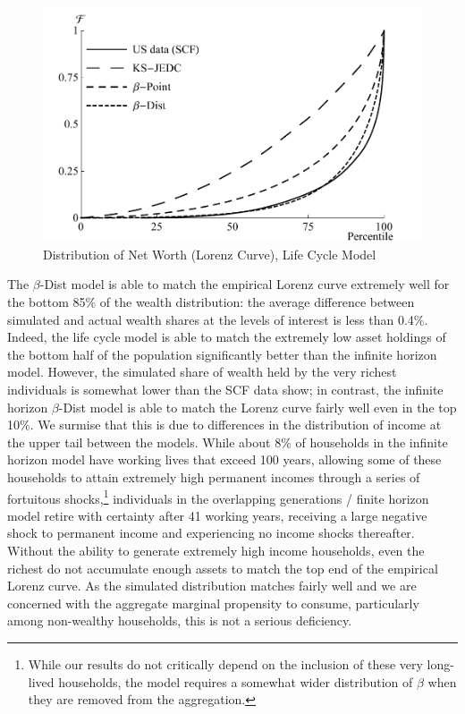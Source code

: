 \documentclass[11pt,a4paper,pdftex]{article}\usepackage[pdftex]{graphicx}\usepackage{epstopdf} \usepackage[pdftex]{hyperref}
\newcommand{\Discount}{\ensuremath{\beta}}
\begin{document}
\begin{figure}
\caption{Distribution of Net Worth (Lorenz Curve), Life Cycle Model}
\label{fig:LorenzLifeCycle}
\begin{center}
\includegraphics[scale=0.75]{../Figures/LifeCycleLorenzPlot.pdf}
\end{center}
\end{figure}

The \Discount-Dist model is able to match the empirical Lorenz curve extremely well for the bottom 85\% of the wealth distribution: the average difference between simulated and actual wealth shares at the levels of interest is less than 0.4\%.  Indeed, the life cycle model is able to match the extremely low asset holdings of the bottom half of the population significantly better than the infinite horizon model.  However, the simulated share of wealth held by the very richest individuals is somewhat lower than the SCF data show; in contrast, the infinite horizon \Discount-Dist model is able to match the Lorenz curve fairly well even in the top 10\%.  We surmise that this is due to differences in the distribution of income at the upper tail between the models.  While about 8\% of households in the infinite horizon model have working lives that exceed 100 years, allowing some of these households to attain extremely high permanent incomes through a series of fortuitous shocks,\footnote{While our results do not critically depend on the inclusion of these very long-lived households, the model requires a somewhat wider distribution of $\Discount$ when they are removed from the aggregation.} individuals in the overlapping generations / finite horizon model retire with certainty after 41 working years, receiving a large negative shock to permanent income and experiencing no income shocks thereafter.  Without the ability to generate extremely high income households, even the richest do not accumulate enough assets to match the top end of the empirical Lorenz curve.  As the simulated distribution matches fairly well and we are concerned with the aggregate marginal propensity to consume, particularly among non-wealthy households, this is not a serious deficiency.
\end{document}
